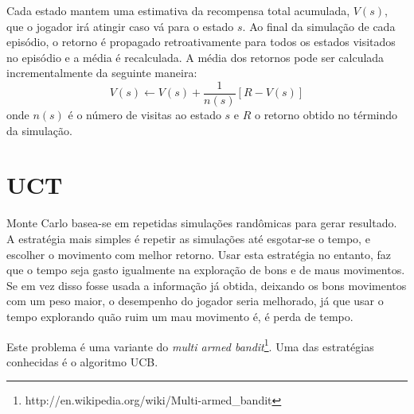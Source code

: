Cada estado mantem uma estimativa da recompensa total acumulada, $V(s)$, que o jogador irá atingir caso vá para o estado $s$. Ao final da simulação de cada episódio, o retorno é propagado retroativamente para todos os estados visitados no episódio e a média é recalculada. A média dos retornos pode ser calculada incrementalmente da seguinte maneira:
\begin{equation}
V(s) \leftarrow V(s) + \frac{1}{n(s)}[R - V(s)]
\end{equation}
onde $n(s)$ é o número de visitas ao estado $s$ e $R$ o retorno obtido no términdo da simulação. 

\section{UCT}
Monte Carlo basea-se em repetidas simulações randômicas para gerar resultado. A estratégia mais simples é repetir as simulações até esgotar-se o tempo, e escolher o movimento com melhor retorno. Usar esta estratégia no entanto, faz que o tempo seja gasto igualmente na exploração de bons e de maus movimentos. Se em vez disso fosse usada a informação já obtida, deixando os bons movimentos com um peso maior, o desempenho do jogador seria melhorado, já que usar o tempo explorando quão ruim um mau movimento é, é perda de tempo. 

Este problema é uma variante do \textit{multi armed bandit}\footnote{http://en.wikipedia.org/wiki/Multi-armed\_bandit}. Uma das estratégias conhecidas é o algoritmo UCB\cite{ucb}.













